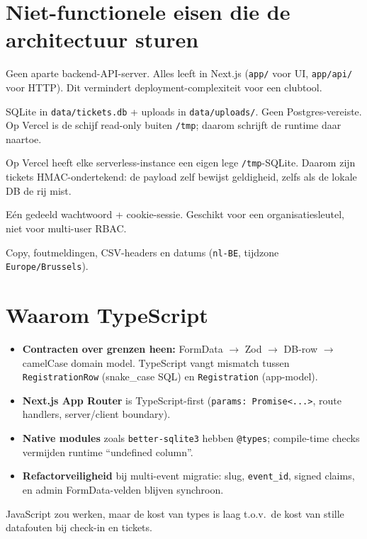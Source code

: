 \documentclass[11pt,a4paper]{report}
\begin{document}
\section{Niet-functionele eisen die de architectuur sturen}
\begin{description}[style=nextline,leftmargin=0pt]
  \item[Eén process / één service]
    Geen aparte backend-API-server. Alles leeft in Next.js (\texttt{app/} voor UI, \texttt{app/api/} voor HTTP).
    Dit vermindert deployment-complexiteit voor een clubtool.
  \item[Locale persistentie]
    SQLite in \texttt{data/tickets.db} + uploads in \texttt{data/uploads/}. Geen Postgres-vereiste.
    Op Vercel is de schijf read-only buiten \texttt{/tmp}; daarom schrijft de runtime daar naartoe.
  \item[Serverless-robust tickets]
    Op Vercel heeft elke serverless-instance een eigen lege \texttt{/tmp}-SQLite.
    Daarom zijn tickets HMAC-ondertekend: de payload zelf bewijst geldigheid, zelfs als de lokale DB de rij mist.
  \item[Admin is ``good enough'', niet enterprise-IAM]
    Eén gedeeld wachtwoord + cookie-sessie. Geschikt voor een organisatiesleutel, niet voor multi-user RBAC.
  \item[Nederlandstalige UX]
    Copy, foutmeldingen, CSV-headers en datums (\texttt{nl-BE}, tijdzone \texttt{Europe/Brussels}).
\end{description}

\section{Waarom TypeScript}
\begin{itemize}[leftmargin=*]
  \item \textbf{Contracten over grenzen heen:} FormData $\to$ Zod $\to$ DB-row $\to$ camelCase domain model.
    TypeScript vangt mismatch tussen \texttt{RegistrationRow} (snake\_case SQL) en \texttt{Registration} (app-model).
  \item \textbf{Next.js App Router} is TypeScript-first (\texttt{params: Promise<...>}, route handlers, server/client boundary).
  \item \textbf{Native modules} zoals \texttt{better-sqlite3} hebben \texttt{@types}; compile-time checks vermijden runtime ``undefined column''.
  \item \textbf{Refactorveiligheid} bij multi-event migratie: slug, \texttt{event\_id}, signed claims, en admin FormData-velden blijven synchroon.
\end{itemize}
JavaScript zou werken, maar de kost van types is laag t.o.v.\ de kost van stille datafouten bij check-in en tickets.
\end{document}
